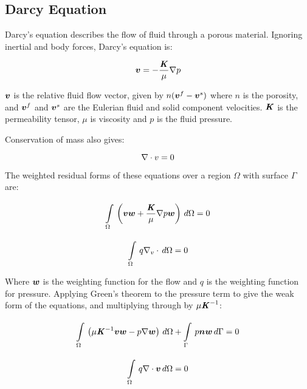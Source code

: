 \subsection{Darcy Equation}

Darcy's equation describes the flow of fluid through a porous material. Ignoring inertial
and body forces, Darcy's equation is:

\begin{equation}
  \vectr{v} = -\frac{\tensor{K}}{\mu} \gradient{}{p}
\end{equation}

$\boldsymbol{v}$ is the relative fluid flow vector, given by $n (\boldsymbol{v}^f - \boldsymbol{v}^s)$ where
$n$ is the porosity, and $\boldsymbol{v}^f$ and $\boldsymbol{v}^s$ are the
Eulerian fluid and solid component velocities.
$\boldsymbol{\mathit{K}}$ is the permeability tensor, $\mu$ is viscosity
and $p$ is the fluid pressure.

Conservation of mass also gives:

\begin{equation}
  \divergence{}{v} = 0
\end{equation}

The weighted residual forms of these equations over a region $\Omega$ with surface $\Gamma$ are:

\begin{equation}
  \gint{\Omega}{}{\left(\vectr{v} \vectr{w} + \frac{\tensor{K}}{\mu} \gradient{}{p} \vectr{w}\right)}{\Omega} = 0
\end{equation}

\begin{equation}
  \gint{\Omega}{}{q \divergence{v}}{\Omega} = 0
\end{equation}

Where $\boldsymbol{w}$ is the weighting function for the flow and $q$ is the weighting function
for pressure.
Applying Green's theorem to the pressure term to give the weak form of the equations, and multiplying through by
$\mu {\ensuremath{\boldsymbol{\mathit{K}}}}^{-1}$:

\begin{equation}
  \gint{\Omega}{}{\left(\mu \inverse{\tensor{K}} \vectr{v} \vectr{w} - p \gradient{}{\vectr{w}}\right)}{\Omega}  + %
  \gint{\Gamma}{}{p \vectr{n} \vectr{w}}{\Gamma}= 0
\end{equation}

\begin{equation}
  \gint{\Omega}{}{q \divergence{}{\vectr{v}}}{\Omega}= 0
\end{equation}

